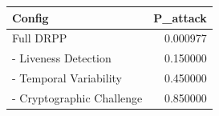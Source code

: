 \begin{tabular}{lr}
\toprule
Config & P_attack \\
\midrule
Full DRPP & 0.000977 \\
- Liveness Detection & 0.150000 \\
- Temporal Variability & 0.450000 \\
- Cryptographic Challenge & 0.850000 \\
\bottomrule
\end{tabular}
